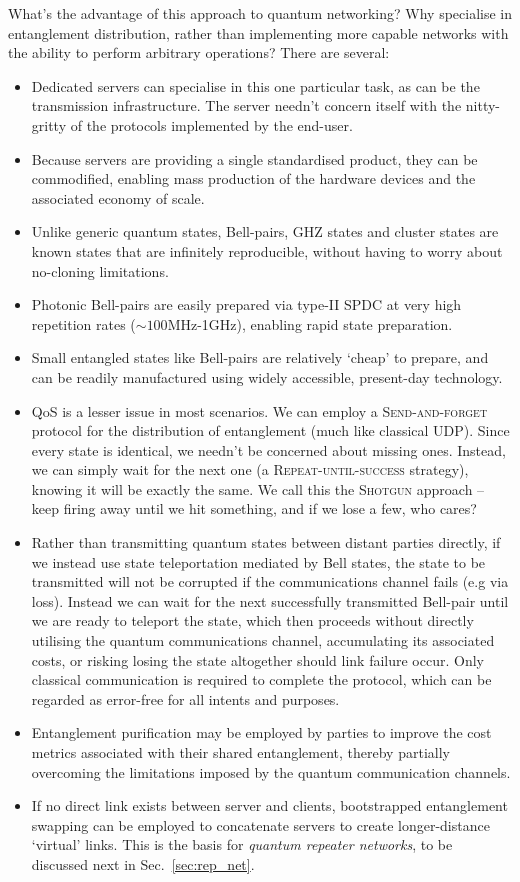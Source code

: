 What's the advantage of this approach to quantum networking? Why specialise in entanglement distribution, rather than implementing more capable networks with the ability to perform arbitrary operations? There are several:
\begin{itemize}
\item Dedicated servers can specialise in this one particular task, as can be the transmission infrastructure. The server needn't concern itself with the nitty-gritty of the protocols implemented by the end-user.
\item Because servers are providing a single standardised product, they can be commodified, enabling mass production of the hardware devices and the associated economy of scale.
\item Unlike generic quantum states, Bell-pairs, GHZ states and cluster states are known states that are infinitely reproducible, without having to worry about no-cloning limitations.
\item Photonic Bell-pairs are easily prepared via type-II SPDC at very high repetition rates (\mbox{$\sim 100$MHz-1GHz}), enabling rapid state preparation.
\item Small entangled states like Bell-pairs are relatively `cheap' to prepare, and can be readily manufactured using widely accessible, present-day technology.
\item QoS is a lesser issue in most scenarios. We can employ a \textsc{Send-and-forget} protocol for the distribution of entanglement (much like classical UDP). Since every state is identical, we needn't be concerned about missing ones. Instead, we can simply wait for the next one (a \textsc{Repeat-until-success} strategy), knowing it will be exactly the same. We call this the \textsc{Shotgun} approach -- keep firing away until we hit something, and if we lose a few, who cares?
\item Rather than transmitting quantum states between distant parties directly, if we instead use state teleportation mediated by Bell states, the state to be transmitted will not be corrupted if the communications channel fails (e.g via loss). Instead we can wait for the next successfully transmitted Bell-pair until we are ready to teleport the state, which then proceeds without directly utilising the quantum communications channel, accumulating its associated costs, or risking losing the state altogether should link failure occur. Only classical communication is required to complete the protocol, which can be regarded as error-free for all intents and purposes.
\item Entanglement purification may be employed by parties to improve the cost metrics associated with their shared entanglement, thereby partially overcoming the limitations imposed by the quantum communication channels.
\item If no direct link exists between server and clients, bootstrapped entanglement swapping can be employed to concatenate servers to create longer-distance `virtual' links. This is the basis for \textit{quantum repeater networks}, to be discussed next in Sec.~\ref{sec:rep_net}.
\end{itemize}

